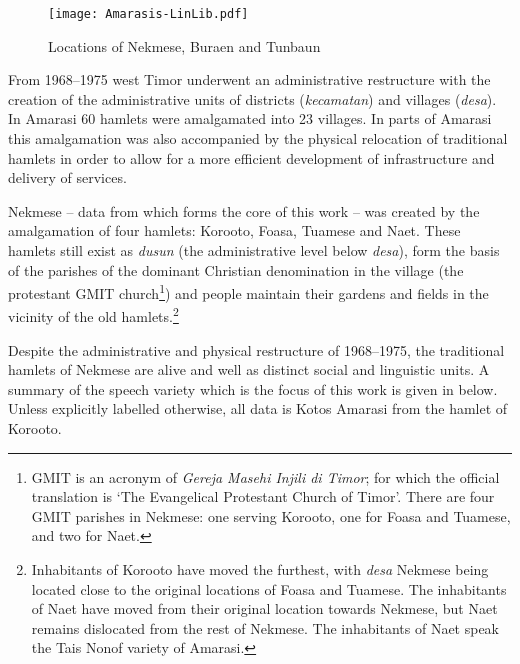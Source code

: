\begin{figure}[ht]
	\caption{Locations of Nekmese{\Q}, Buraen and Tunbaun}\label{fig:LocNekBurTun}
	\texttt{[image: Amarasis-LinLib.pdf]}
\end{figure}

From 1968--1975 west Timor underwent an administrative restructure
with the creation of the administrative units of districts
(\emph{kecamatan}) and villages (\emph{desa}).
In Amarasi 60 hamlets were amalgamated into 23 villages.
In parts of Amarasi this amalgamation was also accompanied by the 
physical relocation of traditional hamlets in order to allow
for a more efficient development of infrastructure and delivery of services.

Nekmese{\Q} -- data from which forms the core of this work --
was created by the amalgamation of four hamlets:
Koro{\Q}oto, Fo{\Q}asa{\Q}, Tuamese{\Q} and Naet.
These hamlets still exist as \emph{dusun}
(the administrative level below \emph{desa}),
form the basis of the parishes of the dominant
Christian denomination in the village
(the protestant GMIT church\footnote{
		GMIT is an acronym of \emph{Gereja Masehi Injili di Timor};
		for which the official translation is `The Evangelical Protestant Church of Timor'.
		There are four GMIT parishes in Nekmese{\Q}:
		one serving Koro{\Q}oto, one for Fo{\Q}asa{\Q} and Tuamese{\Q}, and two for Naet.})
and people maintain their gardens and fields in the vicinity of the old hamlets.\footnote{
		Inhabitants of Koro{\Q}oto have moved the furthest,
		with \emph{desa} Nekmese{\Q} being located close to the original locations
		of Fo{\Q}asa{\Q} and Tuamese{\Q}.
		The inhabitants of Naet have moved from their original location
		towards Nekmese{\Q}, but Naet remains dislocated from the rest of Nekmese{\Q}.
		The inhabitants of Naet speak the Tais Nonof variety of Amarasi.}

Despite the administrative and physical restructure of 1968--1975,
the traditional hamlets of Nekmese{\Q} are alive and well as distinct social and linguistic units.
A summary of the speech variety which is the focus of this work is given in  below.
Unless explicitly labelled otherwise,
all data is Kotos Amarasi from the hamlet of Koro{\Q}oto.

\begin{exe}
	\label{ex:SpeVar}
\end{exe}
